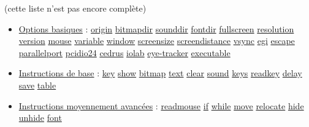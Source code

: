 \documentclass[
]{book}
\begin{document}
(cette liste n'est pas encore complète)

\begin{itemize}
\item
  \protect\hyperlink{options}{Options basiques} :
  \protect\hyperlink{options-origin}{origin} \textbar{}
  \protect\hyperlink{options-origin}{bitmapdir} \textbar{}
  \protect\hyperlink{options-origin}{sounddir} \textbar{}
  \protect\hyperlink{options-origin}{fontdir} \textbar{}
  \protect\hyperlink{options-fullscreen}{fullscreen} \textbar{}
  \protect\hyperlink{options-resolution}{resolution} \textbar{}
  \protect\hyperlink{options-version}{version} \textbar{}
  \protect\hyperlink{options-mouse}{mouse}\textbar{}
  \protect\hyperlink{options-variable}{variable} \textbar{}
  \protect\hyperlink{options-window}{window} \textbar{}
  \protect\hyperlink{options-screensize}{screensize} \textbar{}
  \protect\hyperlink{options-screendistance}{screendistance} \textbar{}
  \protect\hyperlink{options-vsync}{vsync} \textbar{}
  \protect\hyperlink{options-egi}{egi}\textbar{}
  \protect\hyperlink{options-escape}{escape}\textbar{}
  \protect\hyperlink{options-parallelport}{parallelport}\textbar{}
  \protect\hyperlink{options-pcidio24}{pcidio24}\textbar{}
  \protect\hyperlink{options-cedrus}{cedrus} \textbar{}
  \protect\hyperlink{options-iolab}{iolab}\textbar{}
  \protect\hyperlink{option-et}{eye-tracker}\textbar{}
  \protect\hyperlink{options-executable}{executable}
\item
  \protect\hyperlink{_commonly_used_instructions}{Instructions de base}
  : \protect\hyperlink{task-key}{key}\textbar{}
  \protect\hyperlink{task-show}{show} \textbar{}
  \protect\hyperlink{task-bitmap}{bitmap} \textbar{}
  \protect\hyperlink{task-text}{text}\textbar{}
  \protect\hyperlink{task-clear}{clear}\textbar{}
  \protect\hyperlink{task-sound}{sound}\textbar{}
  \protect\hyperlink{task-key}{keys}\textbar{}
  \protect\hyperlink{task-readkey}{readkey} \textbar{}
  \protect\hyperlink{task-delay}{delay} \textbar{}
  \protect\hyperlink{task-save}{save} \textbar{}
  \protect\hyperlink{task-table}{table}
\item
  \protect\hyperlink{less_often_used_instructions}{Instructions
  moyennement avancées} : \protect\hyperlink{task-readmouse}{readmouse}
  \textbar{} \protect\hyperlink{task-if}{if} \textbar{}
  \protect\hyperlink{task-while}{while} \textbar{}
  \protect\hyperlink{task-move}{move} \textbar{}
  \protect\hyperlink{task-relocate}{relocate} \textbar{}
  \protect\hyperlink{task-hide}{hide} \textbar{}
  \href{task-unhide}{unhide} \textbar{}
  \protect\hyperlink{task-font}{font}

\end{itemize}
\end{document}
